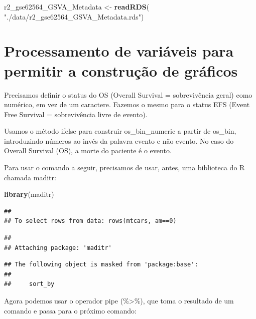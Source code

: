 \documentclass[
]{book}
\newenvironment{Shaded}{\begin{snugshade}}{\end{snugshade}}
\newcommand{\AttributeTok}[1]{\textcolor[rgb]{0.13,0.29,0.53}{#1}}
\newcommand{\FunctionTok}[1]{\textcolor[rgb]{0.13,0.29,0.53}{\textbf{#1}}}
\newcommand{\NormalTok}[1]{#1}
\newcommand{\OtherTok}[1]{\textcolor[rgb]{0.56,0.35,0.01}{#1}}
\newcommand{\SpecialCharTok}[1]{\textcolor[rgb]{0.81,0.36,0.00}{\textbf{#1}}}
\newcommand{\StringTok}[1]{\textcolor[rgb]{0.31,0.60,0.02}{#1}}
\begin{document}
\begin{Shaded}
\begin{Highlighting}[]
\NormalTok{r2\_gse62564\_GSVA\_Metadata }\OtherTok{\textless{}{-}} \FunctionTok{readRDS}\NormalTok{( }\StringTok{"./data/r2\_gse62564\_GSVA\_Metadata.rds"}\NormalTok{)}
\end{Highlighting}
\end{Shaded}

\section{Processamento de variáveis para permitir a construção de gráficos}\label{processamento-de-variuxe1veis-para-permitir-a-construuxe7uxe3o-de-gruxe1ficos}

Precisamos definir o status do OS (Overall Survival = sobrevivência geral) como numérico, em vez de um caractere. Fazemos o mesmo para o status EFS (Event Free Survival = sobrevivência livre de evento).

Usamos o método ifelse para construir os\_bin\_numeric a partir de os\_bin, introduzindo números ao invés da palavra evento e não evento. No caso do Overall Survival (OS), a morte do paciente é o evento.

Para usar o comando a seguir, precisamos de usar, antes, uma biblioteca do R chamada maditr:

\begin{Shaded}
\begin{Highlighting}[]
\FunctionTok{library}\NormalTok{(maditr)}
\end{Highlighting}
\end{Shaded}

\begin{verbatim}
## 
## To select rows from data: rows(mtcars, am==0)
\end{verbatim}

\begin{verbatim}
## 
## Attaching package: 'maditr'
\end{verbatim}

\begin{verbatim}
## The following object is masked from 'package:base':
## 
##     sort_by
\end{verbatim}

Agora podemos usar o operador pipe (\%\textgreater\%), que toma o resultado de um comando e passa para o próximo comando:

\begin{Shaded}
\end{Shaded}
\end{document}
